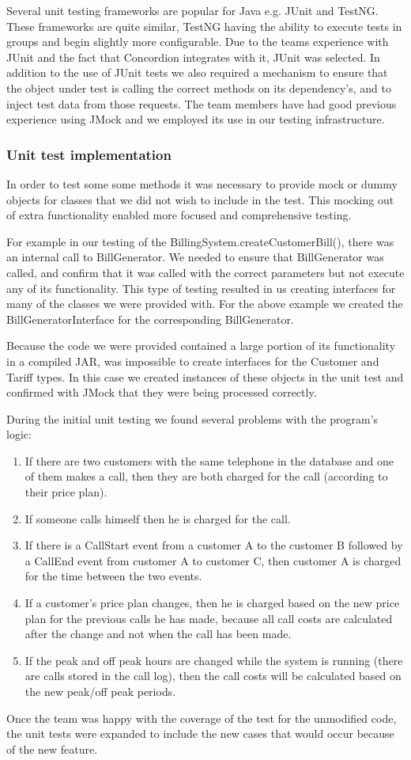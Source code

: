Several unit testing frameworks are popular for Java e.g. JUnit and TestNG. These frameworks are quite similar, TestNG having the ability to execute tests in groups and begin slightly more configurable. Due to the teams experience with JUnit and the fact that Concordion integrates with it, JUnit was selected. In addition to the use of JUnit tests we also required a mechanism to ensure that the object under test is calling the correct methods on its dependency's, and to inject test data from those requests. The team members have had good previous experience using JMock and we employed its use in our testing infrastructure.

\subsubsection*{Unit test implementation}
In order to test some some methods it was necessary to provide mock or dummy objects for classes that we did not wish to include in the test. This mocking out of extra functionality enabled more focused and comprehensive testing.

For example in our testing of the BillingSystem.createCustomerBill(), there was an internal call to BillGenerator. We needed to ensure that BillGenerator was called, and confirm that it was called with the correct parameters but not execute any of its functionality. This type of testing resulted in us creating interfaces for many of the classes we were provided with. For the above example we created the BillGeneratorInterface for the corresponding BillGenerator.

Because the code we were provided contained a large portion of its functionality in a compiled JAR, was impossible to create interfaces for the Customer and Tariff types. In this case we created instances of these objects in the unit test and confirmed with JMock that they were being processed correctly.

During the initial unit testing we found several problems with the program’s logic:

\begin{enumerate}
	\item If there are two customers with the same telephone in the database and one of them makes a call, then they are both charged for the call (according to their price plan).
	\item If someone calls himself then he is charged for the call.
	\item If there is a CallStart event from a customer A to the customer B followed by a CallEnd event from customer A to customer C, then customer A is charged for the time between the two events.
	\item If a customer’s price plan changes, then he is charged based on the new price plan for the previous calls he has made, because all call costs are calculated after the change and not when the call has been made.
	\item If the peak and off peak hours are changed while the system is running (there are calls stored in the call log), then the call costs will be calculated based on the new peak/off peak periods.
\end{enumerate}

Once the team was happy with the coverage of the test for the unmodified code, the unit tests were expanded to include the new cases that would occur because of the new feature. 


